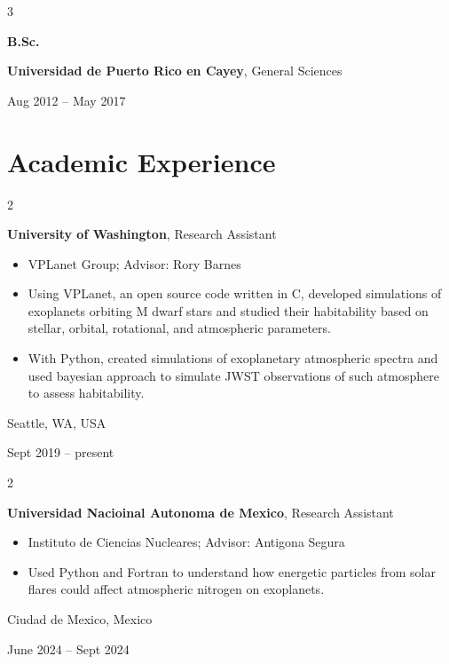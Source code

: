 \documentclass[10pt, letterpaper]{article}
\newenvironment{highlights}{
    \begin{itemize}[
        topsep=0.10 cm,
        parsep=0.10 cm,
        partopsep=0pt,
        itemsep=0pt,
        leftmargin=0.4 cm + 10pt
    ]
}{
    \end{itemize}
} %
\newenvironment{twocolentry}[2][]{
    \onecolentry
    \def\secondColumn{#2}
    \setcolumnwidth{\fill, 4.5 cm}
    \begin{paracol}{2}
}{
    \switchcolumn \raggedleft \secondColumn
    \end{paracol}
    \endonecolentry
} %
\newenvironment{threecolentry}[3][]{
    \onecolentry
    \def\thirdColumn{#3}
    \setcolumnwidth{1 cm, \fill, 4.5 cm}
    \begin{paracol}{3}
    {\raggedright #2} \switchcolumn
}{
    \switchcolumn \raggedleft \thirdColumn
    \end{paracol}
    \endonecolentry
} %
\begin{document}
        \vspace{0.2 cm}

        \begin{threecolentry}{\textbf{B.Sc.}}{
            Aug 2012 – May 2017
        }
            \textbf{Universidad de Puerto Rico en Cayey}, General Sciences
        \end{threecolentry}


    
    \section{Academic Experience}



        
        \begin{twocolentry}{
            Seattle, WA, USA

        Sept 2019 – present
        }
            \textbf{University of Washington}, Research Assistant
            \begin{highlights}
                \item VPLanet Group; Advisor: Rory Barnes
                \item Using VPLanet, an open source code written in C, developed simulations of exoplanets orbiting M dwarf stars and studied their habitability based on stellar, orbital, rotational, and atmospheric parameters.
                \item With Python, created simulations of exoplanetary atmospheric spectra and used bayesian approach to simulate JWST observations of such atmosphere to assess habitability.
            \end{highlights}
        \end{twocolentry}


        \vspace{0.2 cm}

        \begin{twocolentry}{
            Ciudad de Mexico, Mexico

        June 2024 – Sept 2024
        }
            \textbf{Universidad Nacioinal Autonoma de Mexico}, Research Assistant
            \begin{highlights}
                \item Instituto de Ciencias Nucleares; Advisor: Antigona Segura
                \item Used Python and Fortran to understand how energetic particles from solar flares could affect atmospheric nitrogen on exoplanets.
            \end{highlights}
        \end{twocolentry}
\end{document}
